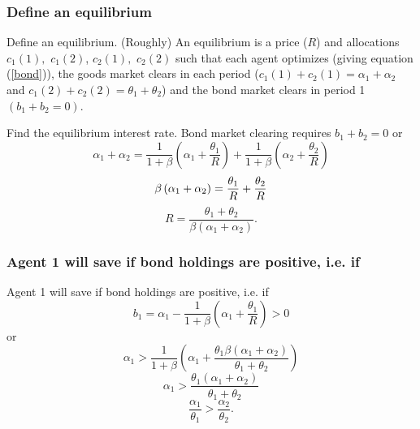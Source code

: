 \documentclass[aspectratio=169]{ltx-talk}
\begin{document}
\begin{frame}
\frametitle{Define an equilibrium}
Define an equilibrium. \newline
(Roughly) An equilibrium is a price ($R$) and allocations $c_{1}\left(
1\right) ,$ $c_{1}\left( 2\right) $, $c_{2}\left( 1\right) ,$ $c_{2}\left(
2\right) $ such that each agent optimizes (giving equation (\ref{bond})),
the goods market clears in each period ($c_{1}\left( 1\right) +c_{2}\left(
1\right) =\alpha _{1}+\alpha _{2}$ and $c_{1}\left( 2\right) +c_{2}\left(
2\right) =\theta _{1}+\theta _{2}$) and the bond market clears in period 1 $%
\left( b_{1}+b_{2}=0\right) .$

Find the equilibrium interest rate. Bond market clearing requires $%
b_{1}+b_{2}=0$ or 
\begin{equation*}
\alpha _{1}+\alpha _{2}=\frac{1}{1+\beta }\left( \alpha _{1}+\frac{\theta
_{1}}{R}\right) +\frac{1}{1+\beta }\left( \alpha _{2}+\frac{\theta _{2}}{R}%
\right)
\end{equation*}%
\begin{equation*}
\beta \left( \alpha _{1}+\alpha _{2}\right) =\frac{\theta _{1}}{R}+\frac{%
\theta _{2}}{R}
\end{equation*}%
\begin{equation*}
R=\frac{\theta _{1}+\theta _{2}}{\beta \left( \alpha _{1}+\alpha _{2}\right) 
}.
\end{equation*}
\end{frame}

\begin{frame}
\frametitle{Agent 1 will save if bond holdings are positive, i.e. if}
Agent 1 will save if bond holdings are positive, i.e. if 
\begin{equation*}
b_{1}=\alpha _{1}-\frac{1}{1+\beta }\left( \alpha _{1}+\frac{\theta _{1}}{R}%
\right) >0
\end{equation*}%
or%
\begin{equation*}
\alpha _{1}>\frac{1}{1+\beta }\left( \alpha _{1}+\frac{\theta _{1}\beta
\left( \alpha _{1}+\alpha _{2}\right) }{\theta _{1}+\theta _{2}}\right)
\end{equation*}%
\begin{equation*}
\alpha _{1}>\frac{\theta _{1}\left( \alpha _{1}+\alpha _{2}\right) }{\theta
_{1}+\theta _{2}}
\end{equation*}%
\begin{equation*}
\frac{\alpha _{1}}{\theta _{1}}>\frac{\alpha _{2}}{\theta _{2}}.
\end{equation*}
\end{frame}
\end{document}
